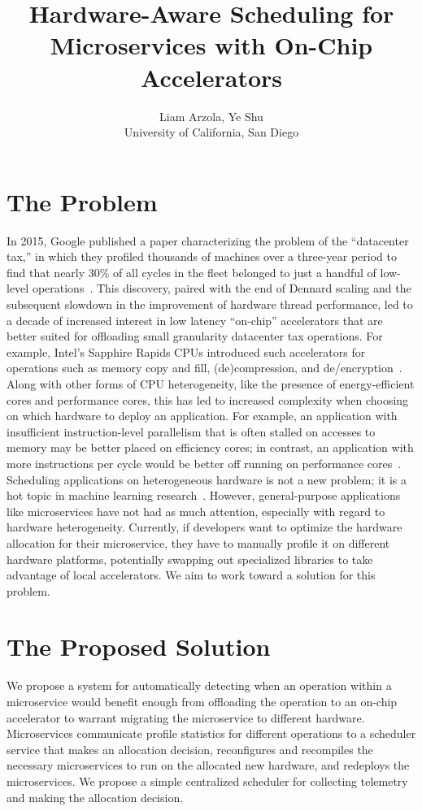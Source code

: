 \documentclass[letterpaper,twocolumn,10pt]{article}
\begin{document}
\date{}
\title{Hardware-Aware Scheduling for Microservices with On-Chip Accelerators}

\author{
{\rm Liam Arzola, Ye Shu}\\
University of California, San Diego
}

\maketitle

\section{The Problem}
In 2015, Google published a paper characterizing the problem of the ``datacenter tax,'' in which they profiled thousands of machines over a three-year period to find that nearly 30\% of all cycles in the fleet belonged to just a handful of low-level operations~\cite{kanev2015profiling}. This discovery, paired with the end of Dennard scaling and the subsequent slowdown in the improvement of hardware thread performance, led to a decade of increased interest in low latency ``on-chip'' accelerators that are better suited for offloading small granularity datacenter tax operations. For example, Intel's Sapphire Rapids CPUs introduced such accelerators for operations such as memory copy and fill, (de)compression, and de/encryption~\cite{yuan2024intel}. Along with other forms of CPU heterogeneity, like the presence of energy-efficient cores and performance cores, this has led to increased complexity when choosing on which hardware to deploy an application. For example, an application with insufficient instruction-level parallelism that is often stalled on accesses to memory may be better placed on efficiency cores; in contrast, an application with more instructions per cycle would be better off running on performance cores~\cite{kanev2015profiling}. Scheduling applications on heterogeneous hardware is not a new problem; it is a hot topic in machine learning research~\cite{narayanan2023hetero,subramanya2023sia}. However, general-purpose applications like microservices have not had as much attention, especially with regard to hardware heterogeneity. Currently, if developers want to optimize the hardware allocation for their microservice, they have to manually profile it on different hardware platforms, potentially swapping out specialized libraries to take advantage of local accelerators. We aim to work toward a solution for this problem.

\section{The Proposed Solution}
We propose a system for automatically detecting when an operation within a microservice would benefit enough from offloading the operation to an on-chip accelerator to warrant migrating the microservice to different hardware. Microservices communicate profile statistics for different operations to a scheduler service that makes an allocation decision, reconfigures and recompiles the necessary microservices to run on the allocated new hardware, and redeploys the microservices. We propose a simple centralized scheduler for collecting telemetry and making the allocation decision.
\end{document}
